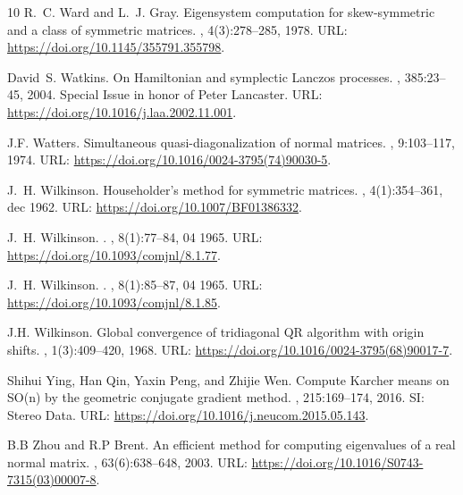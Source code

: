 \documentclass[10pt,twoside,dvipsnames]{siamart1116}
\numberwithin{algorithm}{section}
\numberwithin{equation}{section}
\begin{document}
\begin{thebibliography}{10}
R.~C. Ward and L.~J. Gray.
\newblock Eigensystem computation for skew-symmetric and a class of symmetric
  matrices.
, 4(3):278–285, 1978.
\newblock URL: \url{https://doi.org/10.1145/355791.355798}.

David~S. Watkins.
\newblock On {H}amiltonian and symplectic {L}anczos processes.
, 385:23--45, 2004.
\newblock Special Issue in honor of Peter Lancaster.
\newblock URL: \url{https://doi.org/10.1016/j.laa.2002.11.001}.

J.F. Watters.
\newblock Simultaneous quasi-diagonalization of normal matrices.
, 9:103--117, 1974.
\newblock URL: \url{https://doi.org/10.1016/0024-3795(74)90030-5}.

J.~H. Wilkinson.
\newblock Householder's method for symmetric matrices.
, 4(1):354–361, dec 1962.
\newblock URL: \url{https://doi.org/10.1007/BF01386332}.

J.~H. Wilkinson.
.
, 8(1):77--84, 04 1965.
\newblock URL: \url{https://doi.org/10.1093/comjnl/8.1.77}.

J.~H. Wilkinson.
.
, 8(1):85--87, 04 1965.
\newblock URL: \url{https://doi.org/10.1093/comjnl/8.1.85}.

J.H. Wilkinson.
\newblock Global convergence of tridiagonal {QR} algorithm with origin shifts.
, 1(3):409--420, 1968.
\newblock URL: \url{https://doi.org/10.1016/0024-3795(68)90017-7}.

Shihui Ying, Han Qin, Yaxin Peng, and Zhijie Wen.
\newblock Compute {K}archer means on {SO}(n) by the geometric conjugate
  gradient method.
, 215:169--174, 2016.
\newblock SI: Stereo Data.
\newblock URL: \url{https://doi.org/10.1016/j.neucom.2015.05.143}.

B.B Zhou and R.P Brent.
\newblock An efficient method for computing eigenvalues of a real normal
  matrix.
, 63(6):638--648,
  2003.
\newblock URL: \url{https://doi.org/10.1016/S0743-7315(03)00007-8}.


\end{thebibliography}
\end{document}
